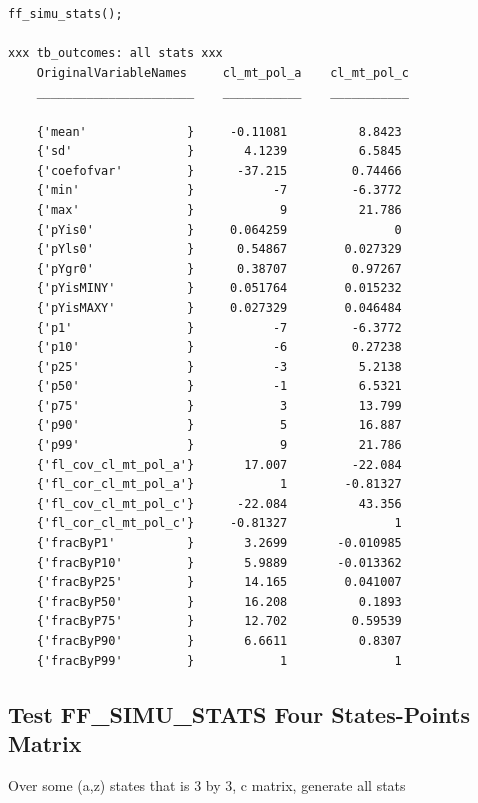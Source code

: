 \documentclass[
]{book}
\begin{document}
\begin{verbatim}
ff_simu_stats();

xxx tb_outcomes: all stats xxx
    OriginalVariableNames     cl_mt_pol_a    cl_mt_pol_c
    ______________________    ___________    ___________

    {'mean'              }     -0.11081          8.8423 
    {'sd'                }       4.1239          6.5845 
    {'coefofvar'         }      -37.215         0.74466 
    {'min'               }           -7         -6.3772 
    {'max'               }            9          21.786 
    {'pYis0'             }     0.064259               0 
    {'pYls0'             }      0.54867        0.027329 
    {'pYgr0'             }      0.38707         0.97267 
    {'pYisMINY'          }     0.051764        0.015232 
    {'pYisMAXY'          }     0.027329        0.046484 
    {'p1'                }           -7         -6.3772 
    {'p10'               }           -6         0.27238 
    {'p25'               }           -3          5.2138 
    {'p50'               }           -1          6.5321 
    {'p75'               }            3          13.799 
    {'p90'               }            5          16.887 
    {'p99'               }            9          21.786 
    {'fl_cov_cl_mt_pol_a'}       17.007         -22.084 
    {'fl_cor_cl_mt_pol_a'}            1        -0.81327 
    {'fl_cov_cl_mt_pol_c'}      -22.084          43.356 
    {'fl_cor_cl_mt_pol_c'}     -0.81327               1 
    {'fracByP1'          }       3.2699       -0.010985 
    {'fracByP10'         }       5.9889       -0.013362 
    {'fracByP25'         }       14.165        0.041007 
    {'fracByP50'         }       16.208          0.1893 
    {'fracByP75'         }       12.702         0.59539 
    {'fracByP90'         }       6.6611          0.8307 
    {'fracByP99'         }            1               1 
\end{verbatim}

\hypertarget{test-ff_simu_stats-four-states-points-matrix}{%
\subsection{Test FF\_SIMU\_STATS Four States-Points Matrix}\label{test-ff_simu_stats-four-states-points-matrix}}

Over some (a,z) states that is 3 by 3, c matrix, generate all stats
\end{document}
